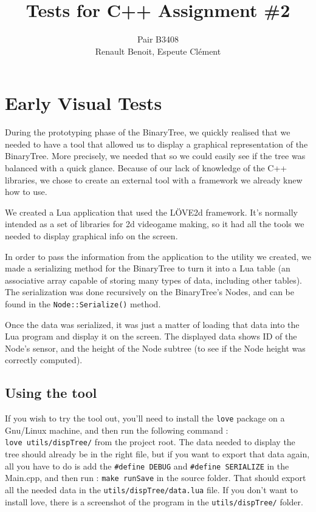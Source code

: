 \documentclass[10pt]{article}
\title{Tests for C++ Assignment \#2}
\author{Pair B3408 \\ {\sc Renault} Benoit, {\sc Espeute} Clément}
\date{}
\begin{document}
\pagestyle{fancy}
\maketitle
\section{Early Visual Tests}
During the prototyping phase of the BinaryTree, we quickly realised that we needed to have a tool that allowed us to display a graphical representation of the BinaryTree. More precisely, we needed that so we could easily see if the tree was balanced with a quick glance. Because of our lack of knowledge of the C++ libraries, we chose to create an external tool with a framework we already knew how to use.

We created a Lua application that used the LÖVE2d framework. It's normally intended as a set of libraries for 2d videogame making, so it had all the tools we needed to display graphical info on the screen.

In order to pass the information from the application to the utility we created, we made a serializing method for the BinaryTree to turn it into a Lua table (an associative array capable of storing many types of data, including other tables). The serialization was done recursively on the BinaryTree's Nodes, and can be found in the \texttt{Node::Serialize()} method.

Once the data was serialized, it was just a matter of loading that data into the Lua program and display it on the screen. The displayed data shows ID of the Node's sensor, and the height of the Node subtree (to see if the Node height was correctly computed).

\subsection*{Using the tool}
If you wish to try the tool out, you'll need to install the \texttt{love} package on a Gnu/Linux machine, and then run the following command : \texttt{love~utils/dispTree/} from the project root. The data needed to display the tree should already be in the right file, but if you want to export that data again, all you have to do is add the {\tt \#define DEBUG} and {\tt \#define SERIALIZE} in the Main.cpp, and then run : \texttt{make runSave} in the source folder. That should export all the needed data in the \texttt{utils/dispTree/data.lua} file. If you don't want to install love, there is a screenshot of the program in the \texttt{utils/dispTree/} folder.
\end{document}

